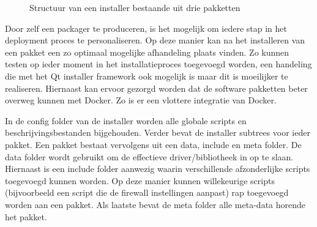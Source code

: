 \begin{figure}[!ht]
\centering
{}
\caption{Structuur van een installer bestaande uit drie pakketten}
\label{fig:installerStructuur}
\end{figure}

Door zelf een packager te produceren, is het mogelijk om iedere stap in het deployment proces te personaliseren.
Op deze manier kan na het installeren van een pakket een zo optimaal mogelijke afhandeling plaats vinden.
Zo kunnen testen op ieder moment in het installatieproces toegevoegd worden, een handeling die met het Qt installer framework ook mogelijk is maar dit is moeilijker te realiseren.
Hiernaast kan ervoor gezorgd worden dat de software pakketten beter overweg kunnen met Docker.
Zo is er een vlottere integratie van Docker.

In de config folder van de installer worden alle globale scripts en beschrijvingsbestanden bijgehouden.
Verder bevat de installer subtrees voor ieder pakket.
Een pakket bestaat vervolgens uit een data, include en meta folder.
De data folder wordt gebruikt om de effectieve driver/bibliotheek in op te slaan.
Hiernaast is een include folder aanwezig waarin verschillende afzonderlijke scripts toegevoegd kunnen worden.
Op deze manier kunnen willekeurige scripts (bijvoorbeeld een script die de firewall instellingen aanpast) rap toegevoegd worden aan een pakket.
Als laatste bevat de meta folder alle meta-data horende het pakket.

